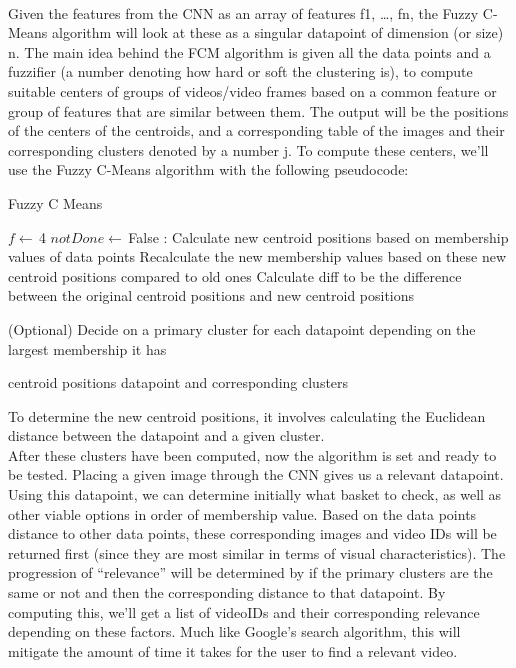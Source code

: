 \documentclass[10pt,twocolumn]{article}
\begin{document}
\\
\indent Given the features from the CNN as an array of features {f1, …, fn}, the Fuzzy C-Means algorithm will look at these as a singular datapoint of dimension (or size) n. The main idea behind the FCM algorithm is given all the data points and a fuzzifier (a number denoting how hard or soft the clustering is), to compute suitable centers of groups of videos/video frames based on a common feature or group of features that are similar between them. The output will be the positions of the centers of the centroids, and a corresponding table of the images and their corresponding clusters denoted by a number j. To compute these centers, we’ll use the Fuzzy C-Means algorithm with the following pseudocode:
\begin {algorithm}
\caption {Fuzzy C Means} \label {algo}
\begin {algorithmic}[1]
	\State $f \gets  \, $4
	\State $notDone \gets  \, $False
	:
		\State Calculate new centroid positions based on membership values of data points
		\State Recalculate the new membership values based on these new centroid positions compared to old ones
		\State Calculate diff to be the difference between the original centroid positions and new centroid positions
	
	\EndWhile
	(Optional) Decide on a primary cluster for each datapoint depending on the largest membership it has
	
	 centroid positions datapoint and corresponding clusters
\end{algorithmic}
\end{algorithm}
To determine the new centroid positions, it involves calculating the Euclidean distance between the datapoint and a given cluster. 
\\
\indent 
After these clusters have been computed, now the algorithm is set and ready to be tested. Placing a given image through the CNN gives us a relevant datapoint. Using this datapoint, we can determine initially what basket to check, as well as other viable options in order of membership value. Based on the data points distance to other data points, these corresponding images and video IDs will be returned first (since they are most similar in terms of visual characteristics). The progression of “relevance” will be determined by if the primary clusters are the same or not and then the corresponding distance to that datapoint. By computing this, we’ll get a list of videoIDs and their corresponding relevance depending on these factors. Much like Google’s search algorithm, this will mitigate the amount of time it takes for the user to find a relevant video.
\end{document}
